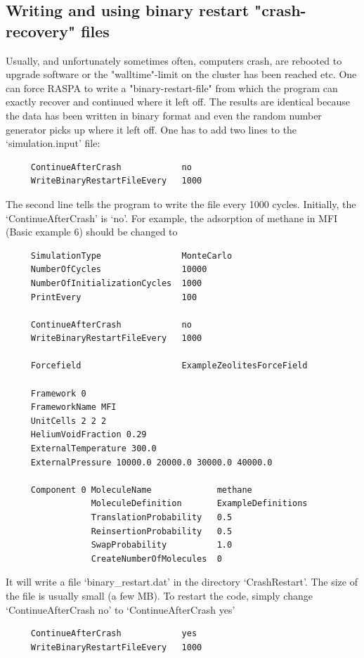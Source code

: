 \subsection*{Writing and using binary restart "crash-recovery" files}

Usually, and unfortunately sometimes often, computers crash, are rebooted to upgrade software or the "walltime"-limit on the cluster has been reached etc.
One can force RASPA to write a "binary-restart-file" from which the program can exactly recover and continued
where it left off. The results are identical because the data has been written in binary format and even the
random number generator picks up where it left off.
One has to add two lines to the `simulation.input' file:
\begin{tiny}
\begin{verbatim}
     ContinueAfterCrash            no
     WriteBinaryRestartFileEvery   1000
\end{verbatim}
\end{tiny}
The second line tells the program to write the file every 1000 cycles. Initially, the `ContinueAfterCrash' is `no'.
For example, the adsorption of methane in MFI (Basic example 6) should be changed to

\begin{tiny}
\begin{verbatim}
     SimulationType                MonteCarlo
     NumberOfCycles                10000
     NumberOfInitializationCycles  1000
     PrintEvery                    100

     ContinueAfterCrash            no
     WriteBinaryRestartFileEvery   1000

     Forcefield                    ExampleZeolitesForceField

     Framework 0
     FrameworkName MFI
     UnitCells 2 2 2
     HeliumVoidFraction 0.29
     ExternalTemperature 300.0
     ExternalPressure 10000.0 20000.0 30000.0 40000.0

     Component 0 MoleculeName             methane
                 MoleculeDefinition       ExampleDefinitions
                 TranslationProbability   0.5
                 ReinsertionProbability   0.5
                 SwapProbability          1.0
                 CreateNumberOfMolecules  0
\end{verbatim}
\end{tiny}
It will write a file `binary\_restart.dat' in the directory `CrashRestart'. The size of the file is usually small (a few MB).
To restart the code, simply change `ContinueAfterCrash no' to `ContinueAfterCrash yes'
\begin{tiny}
\begin{verbatim}
     ContinueAfterCrash            yes
     WriteBinaryRestartFileEvery   1000
\end{verbatim}
\end{tiny}

\newpage




